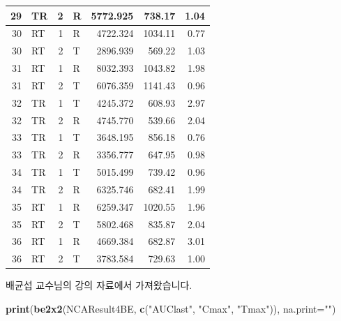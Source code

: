 \documentclass[12pt,]{krantz}
\newenvironment{Shaded}{\begin{snugshade}}{\end{snugshade}}
\newcommand{\DataTypeTok}[1]{\textcolor[rgb]{0.13,0.29,0.53}{#1}}
\newcommand{\KeywordTok}[1]{\textcolor[rgb]{0.13,0.29,0.53}{\textbf{#1}}}
\newcommand{\NormalTok}[1]{#1}
\newcommand{\StringTok}[1]{\textcolor[rgb]{0.31,0.60,0.02}{#1}}
\begin{document}
\begin{table}
\begin{tabular}[t]{r|l|r|l|r|r|r}
\hline
29 & TR & 2 & R & 5772.925 & 738.17 & 1.04\\
\hline
30 & RT & 1 & R & 4722.324 & 1034.11 & 0.77\\
\hline
30 & RT & 2 & T & 2896.939 & 569.22 & 1.03\\
\hline
31 & RT & 1 & R & 8032.393 & 1043.82 & 1.98\\
\hline
31 & RT & 2 & T & 6076.359 & 1141.43 & 0.96\\
\hline
32 & TR & 1 & T & 4245.372 & 608.93 & 2.97\\
\hline
32 & TR & 2 & R & 4745.770 & 539.66 & 2.04\\
\hline
33 & TR & 1 & T & 3648.195 & 856.18 & 0.76\\
\hline
33 & TR & 2 & R & 3356.777 & 647.95 & 0.98\\
\hline
34 & TR & 1 & T & 5015.499 & 739.42 & 0.96\\
\hline
34 & TR & 2 & R & 6325.746 & 682.41 & 1.99\\
\hline
35 & RT & 1 & R & 6259.347 & 1020.55 & 1.96\\
\hline
35 & RT & 2 & T & 5802.468 & 835.87 & 2.04\\
\hline
36 & RT & 1 & R & 4669.384 & 682.87 & 3.01\\
\hline
36 & RT & 2 & T & 3783.584 & 729.63 & 1.00\\
\hline
\end{tabular}
\end{table}

배균섭 교수님의 강의 자료에서 가져왔습니다.

\begin{Shaded}
\begin{Highlighting}[]
\KeywordTok{print}\NormalTok{(}\KeywordTok{be2x2}\NormalTok{(NCAResult4BE, }\KeywordTok{c}\NormalTok{(}\StringTok{"AUClast"}\NormalTok{, }\StringTok{"Cmax"}\NormalTok{, }\StringTok{"Tmax"}\NormalTok{)), }\DataTypeTok{na.print=}\StringTok{""}\NormalTok{) }
\end{Highlighting}
\end{Shaded}
\end{document}
